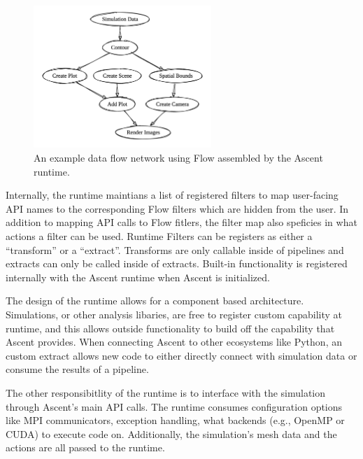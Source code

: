 \begin{figure}
\centering
\includegraphics[width=0.6\textwidth]{images/flow_graph}
\caption{\label{img:flow_graph} An example data flow network using Flow assembled by the Ascent runtime.}
\end{figure}

Internally, the runtime maintians a list of registered filters to map
user-facing API names to the corresponding Flow filters which are hidden
from the user.
%
In addition to mapping API calls to Flow fitlers, the filter map also speficies
in what actions a filter can be used.
%
Runtime Filters can be registers as either a ``transform'' or a ``extract''.
%
Transforms are only callable inside of pipelines and extracts can only be called inside of
extracts.
%
Built-in functionality is registered internally with the Ascent runtime when Ascent is initialized.


The design of the runtime allows for a component based architecture.
%
Simulations, or other analysis libaries, are free to register custom capability at
runtime, and this allows outside functionality to build off the capability that Ascent provides.
%
When connecting Ascent to other ecosystems like Python, an custom extract allows new code to either
directly connect with simulation data or consume the results of a pipeline.

The other responsibitlity of the runtime is to interface with the simulation through Ascent's
main API calls.
%
The runtime consumes configuration options like MPI communicators, exception handling, what
backends (e.g., OpenMP or CUDA) to execute code on.
%
Additionally, the simulation's mesh data and the actions are all passed to the runtime.

